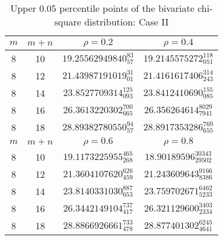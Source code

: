 \newdimen\captionwidth \captionwidth=3.7in
\begin{table}[ht]
\caption{Upper 0.05 percentile points of the bivariate chi-square distribution:
Case II}
\label{case2:05}
\begin{center}
\begin{tabular}{c|c|c|c}
$ m $ & $m+n$ & $\rho=0.2$ & $\rho=0.4$  \\ \hline
8 & 10 & $19.25562949840_{57}^{83}$ &  $19.2145575272_{051}^{118}$ \\ 
8 & 12 & $21.43987191019_{01}^{31}$ & $21.4161617406_{243}^{314}$ \\
8 & 14 & $23.8527709314_{093}^{125}$ & $23.8412410690_{085}^{155}$ \\
8 & 16 & $26.3613220302_{665}^{700}$ & $26.356264614_{7941}^{8029}$ \\
8 & 18 & $28.89382780550_{57}^{94}$ & $28.8917353286_{655}^{769}$ \\

$ m $ & $m+n$ & $\rho=0.6$ &  $\rho=0.8$ \\ \hline
8 & 10 & $19.1173225955_{268}^{465}$ & $18.90189596_{29502}^{30343}$ \\ 
8 & 12 & $21.3604107620_{459}^{626}$ & $21.243609643_{8386}^{9166}$ \\
8 & 14 & $23.8140331030_{653}^{887}$ & $23.759702671_{5233}^{6462}$ \\
8 & 16 & $26.3442149104_{417}^{737}$ & $26.321129600_{2334}^{3403}$ \\
8 & 18 & $28.8866926661_{478}^{733}$ & $28.877401302_{4641}^{6245}$ \\

\end{tabular}
\end{center}
\end{table}


